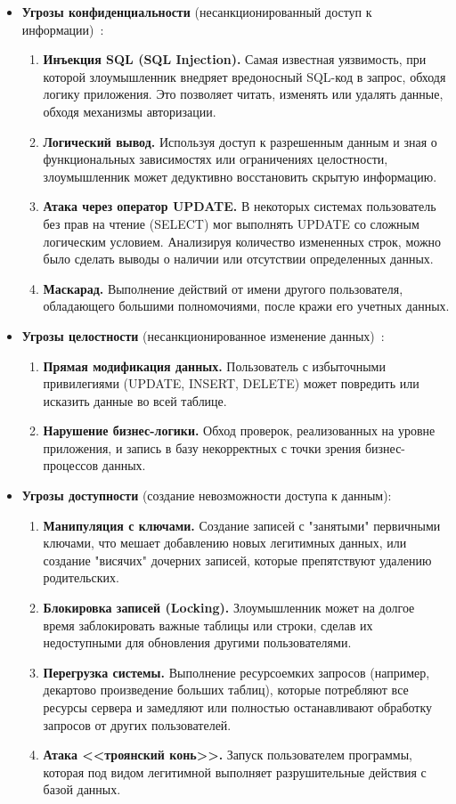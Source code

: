 \begin{itemize}
	\item \textbf{Угрозы конфиденциальности} (несанкционированный доступ к информации)~\label{ugr:conf}:
	\begin{enumerate}
		\item \textbf{Инъекция SQL (SQL Injection).} Самая известная уязвимость, при которой злоумышленник внедряет вредоносный SQL-код в запрос, обходя логику приложения. Это позволяет читать, изменять или удалять данные, обходя механизмы авторизации.
		\item \textbf{Логический вывод.} Используя доступ к разрешенным данным и зная о функциональных зависимостях или ограничениях целостности, злоумышленник может дедуктивно восстановить скрытую информацию.
		\item \textbf{Атака через оператор UPDATE.} В некоторых системах пользователь без прав на чтение (SELECT) мог выполнять UPDATE со сложным логическим условием. Анализируя количество измененных строк, можно было сделать выводы о наличии или отсутствии определенных данных.
		\item \textbf{Маскарад.} Выполнение действий от имени другого пользователя, обладающего большими полномочиями, после кражи его учетных данных.
	\end{enumerate}
	\item \textbf{Угрозы целостности} (несанкционированное изменение данных)~\label{ugr:cel}:
	\begin{enumerate}
		\item \textbf{Прямая модификация данных.} Пользователь с избыточными привилегиями (UPDATE, INSERT, DELETE) может повредить или исказить данные во всей таблице.
        \item \textbf{Нарушение бизнес-логики.} Обход проверок, реализованных на уровне приложения, и запись в базу некорректных с точки зрения бизнес-процессов данных.
	\end{enumerate}
	\item \textbf{Угрозы доступности} (создание невозможности доступа к данным):
	\begin{enumerate}
		\item \textbf{Манипуляция с ключами.} Создание записей с "занятыми" первичными ключами, что мешает добавлению новых легитимных данных, или создание "висячих" дочерних записей, которые препятствуют удалению родительских.
		\item \textbf{Блокировка записей (Locking).} Злоумышленник может на долгое время заблокировать важные таблицы или строки, сделав их недоступными для обновления другими пользователями.
		\item \textbf{Перегрузка системы.} Выполнение ресурсоемких запросов (например, декартово произведение больших таблиц), которые потребляют все ресурсы сервера и замедляют или полностью останавливают обработку запросов от других пользователей.
		\item \textbf{Атака <<троянский конь>>.} Запуск пользователем программы, которая под видом легитимной выполняет разрушительные действия с базой данных.
	\end{enumerate}
\end{itemize}


